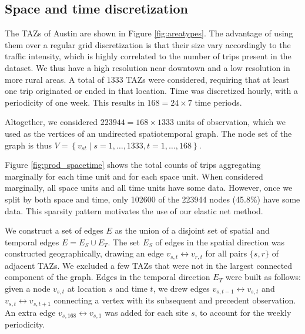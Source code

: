 \documentclass[11pt]{article}
\begin{document}
\subsection{Space and time discretization}

The TAZs of Austin are shown in Figure \ref{fig:areatypes}. The advantage of using them over a regular grid discretization is that their size vary accordingly to the traffic intensity, which is highly correlated to the number of trips present in the dataset. We thus have a high resolution near downtown and a low resolution in more rural areas. A total of $1333$ TAZs were considered, requiring that at least one trip originated or ended in that location. Time was discretized hourly, with a periodicity of one week. This results in $168=24\times7$ time periods.

Altogether, we considered $223944=168\times1333$ units of observation, which we used as the vertices of an undirected spatiotemporal graph. The node set of the graph is thus $V=
\left\{v_{st} \mid s=1,\hdots,1333, t=1,\hdots,168\right\}$.

Figure \ref{fig:prod_spacetime} shows the total counts of trips aggregating marginally for each time unit and for each space unit. When considered marginally, all space units and all time units have some data. However, once we split by both space and time, only 102600 of the 223944 nodes (45.8\%) have some data. This sparsity pattern motivates the use of our  elastic net method. 

We construct a set of edges $E$ as the union of a disjoint set of spatial and temporal edges $E=E_S\cup E_T$. The set $E_S$ of edges in the spatial direction was constructed geographically, drawing an edge $v_{s,t} \longleftrightarrow v_{r,t}$ for all pairs  $
\{s, r\}$ of adjacent TAZs. We excluded a few TAZs that were not in the largest connected component of the graph. Edges in the temporal direction $E_T$ were built as follows: given a node $v_{s,t}$ at location $s$ and time $t$, we drew edges $v_{s,t-1} \longleftrightarrow v_{s,t}$ and $v_{s,t} \longleftrightarrow v_{s,t+1}$ connecting a vertex with its subsequent and precedent observation. An extra edge $v_{s,168} \longleftrightarrow v_{s,1}$ was added for each site $s$, to account for the weekly periodicity. 
\end{document}
